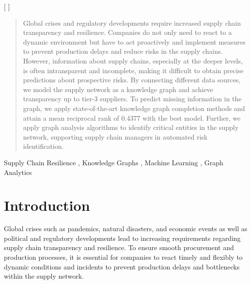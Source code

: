 \documentclass[
]{ceurart}
\begin{document}
\author[1,4]{Volker Tresp}[%
]
\begin{abstract}
Global crises and regulatory developments require increased supply chain transparency and resilience. Companies do not only need to react to a dynamic environment but have to act proactively and implement measures to prevent production delays and reduce risks in the supply chains. However, information about supply chains, especially at the deeper levels, is often intransparent and incomplete, making it difficult to obtain precise predictions about prospective risks. By connecting different data sources, we model the supply network as a knowledge graph and achieve transparency up to tier-3 suppliers. To predict missing information in the graph, we apply state-of-the-art knowledge graph completion methods and attain a mean reciprocal rank of 0.4377 with the best model. Further, we apply graph analysis algorithms to identify critical entities in the supply network, supporting supply chain managers in automated risk identification.
\end{abstract}
\begin{keywords}
  Supply Chain Resilience \sep
  Knowledge Graphs \sep
  Machine Learning \sep
  Graph Analytics
\end{keywords}
\maketitle


\section{Introduction}
Global crises such as pandemics, natural disasters, and economic events as well as political and regulatory developments 
lead to increasing requirements regarding supply chain transparency and resilience. To ensure smooth procurement and production processes, it is essential for companies to react timely and flexibly to dynamic conditions and incidents to prevent production delays and bottlenecks within the supply network. 
\end{document}
